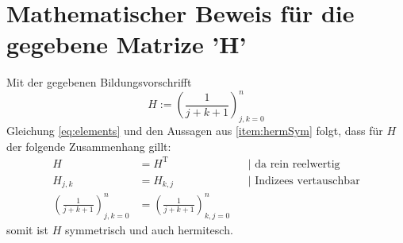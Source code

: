 \section{Mathematischer Beweis für die gegebene Matrize 'H'}
Mit der gegebenen Bildungsvorschrifft
\begin{equation}
    H := \left(\frac{1}{j+k+1}\right)_{j,k=0}^{n}
\end{equation}
Gleichung \ref{eq:elements} und den Aussagen aus \ref{item:hermSym} folgt, dass für \(H\) der
folgende Zusammenhang gillt:
\begin{align}
                                       H &= H^{\mathrm T} &&| \text{ da rein reelwertig}      \\
                                 H_{j,k} &= H_{k,j} &&| \text{ Indizees vertauschbar}         \\
\left(\frac{1}{j+k+1}\right)_{j,k=0}^{n} &= \left(\frac{1}{j+k+1}\right)_{k,j=0}^{n} &&
\end{align}
somit ist \(H\) symmetrisch und auch hermitesch.